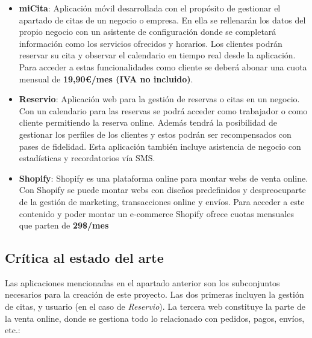 \vspace{-0.5em}
\begin{itemize}
    \item \textbf{miCita}: Aplicación móvil desarrollada con el propósito de gestionar el apartado de citas de un
    negocio o empresa. En ella se rellenarán los datos del propio negocio con un asistente de configuración donde
    se completará información como los servicios ofrecidos y horarios. Los clientes podrán reservar su cita y
    observar el calendario en tiempo real desde la aplicación. Para acceder a estas funcionalidades como cliente
    se deberá abonar una cuota mensual de \textbf{19,90\euro/mes (IVA no incluido)}.\cite{micita}

    \item \textbf{Reservio}: Aplicación web para la gestión de reservas o citas en un negocio.
    Con un calendario para las reservas se podrá acceder como trabajador o como cliente permitiendo la reserva online.
    Además tendrá la posibilidad de gestionar los perfiles de los clientes  y estos podrán ser recompensados
    con pases de fidelidad. Esta aplicación también incluye asistencia de negocio con estadísticas y
    recordatorios vía SMS.\cite{reservio}

    \item \textbf{Shopify}: Shopify es una plataforma online para montar webs de venta online. Con Shopify se puede
    montar webs con diseños predefinidos y despreocuparte de la gestión de marketing, transacciones online
    y envíos. Para acceder a este contenido y poder montar un e-commerce Shopify ofrece cuotas mensuales que parten de
    \textbf{29\$/mes}\cite{shopify}
\end{itemize}

\subsection{Crítica al estado del arte}

Las aplicaciones mencionadas en el apartado anterior son los subconjuntos necesarios para la creación de este proyecto.
Las dos primeras incluyen la gestión de citas, y usuario (en el caso de \textit{Reservio}). La tercera web constituye
la parte de la venta online, donde se gestiona todo lo relacionado con pedidos, pagos, envíos, etc.:

\vspace{-0.5em}

